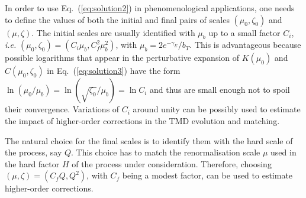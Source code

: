 \documentclass[10pt,a4paper]{article}
\begin{document}
In order to use Eq.~(\ref{eq:solution2}) in phenomenological
applications, one needs to define the values of both the initial and
final pairs of scales $(\mu_0,\zeta_0)$ and $(\mu,\zeta)$. The initial
scales are usually identified with $\mu_b$ up to a small factor $C_i$,
\textit{i.e.}  $(\mu_0,\zeta_0) = (C_i\mu_b,C_f^2\mu_b^2)$, with
$\mu_b = 2e^{-\gamma_E}/b_T$. This is advantageous because possible
logarithms that appear in the perturbative expansion of $K(\mu_0)$ and
$C(\mu_0,\zeta_0)$ in Eq.~(\ref{eq:solution3}) have the form
$\ln(\mu_0/\mu_b)=\ln(\sqrt{\zeta_0}/\mu_b)=\ln C_i$ and thus are
small enough not to spoil their convergence. Variations of $C_i$
around unity can be possibly used to estimate the impact of
higher-order corrections in the TMD evolution and matching.

The natural choice for the final scales is to identify them with the
hard scale of the process, say $Q$. This choice has to match the
renormalisation scale $\mu$ used in the hard factor $H$ of the process
under consideration. Therefore, choosing $(\mu,\zeta) = (C_fQ,Q^2)$,
with $C_f$ being a modest factor, can be used to estimate higher-order
corrections.


\end{document}
